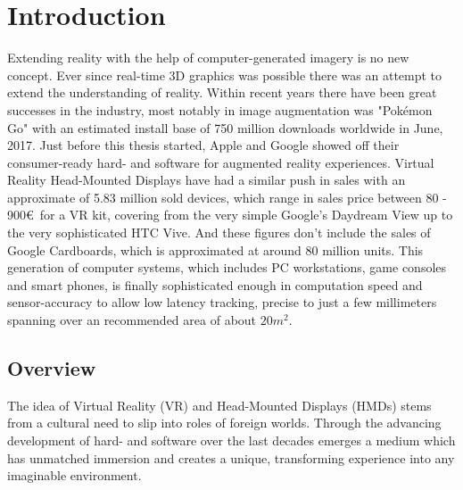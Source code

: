 %
\chapter{Introduction}
\label{sec:intro}


Extending reality with the help of computer-generated imagery is no new 
concept. Ever since real-time 3D graphics was possible there was an attempt to 
extend the understanding of reality. Within recent years there have been 
great successes in the industry, most notably in image augmentation was 
"Pokémon Go" with an estimated install base of 750 million downloads 
worldwide in June, 2017\cite{appannie:2017}. Just before this thesis 
started, Apple and Google showed off their consumer-ready hard- and software 
for augmented reality experiences.
\newline
Virtual Reality Head-Mounted Displays have had a similar push in sales with an 
approximate of 5.83 million sold devices, which range in sales price between 
80 - 900€ for a VR kit, covering from the very simple Google's Daydream View up 
to the very sophisticated HTC Vive\cite{erguerel:2017}. And these figures don't 
include the sales of Google Cardboards, which is approximated at around 80  
million units\cite{superdata:market-brief:2017}.
\newline
This generation of computer systems, which includes PC workstations, game 
consoles and smart phones, is finally sophisticated enough in computation speed 
and sensor-accuracy to allow low latency tracking, precise to just a few 
millimeters spanning over an recommended area of about 
$20m^2$\cite{htc:vive-manual:2016}.

\section{Overview}
\label{sec:intro:outline}

The idea of Virtual Reality (VR) and Head-Mounted Displays (HMDs) stems from a 
cultural need to slip into roles of foreign worlds. Through the advancing 
development of hard- and software over the last decades emerges a medium which 
has unmatched immersion and creates a unique, transforming experience into any 
imaginable environment.

